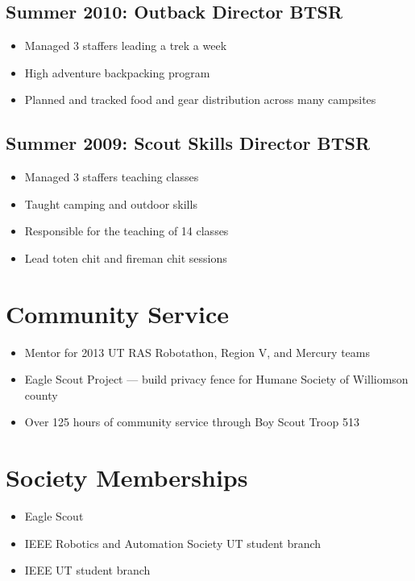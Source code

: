 \documentclass[letterpaper,12pt]{resume}
\begin{document}
\subsection{Summer 2010: Outback Director BTSR}
\begin{itemize}
  \item
    Managed 3 staffers leading a trek a week
  \item
    High adventure backpacking program
  \item
    Planned and tracked food and gear distribution across many campsites
\end{itemize}

\subsection{Summer 2009: Scout Skills Director BTSR}
\begin{itemize}
  \item
    Managed 3 staffers teaching classes
  \item
    Taught camping and outdoor skills
  \item
    Responsible for the teaching of 14 classes
  \item
    Lead toten chit and fireman chit sessions
\end{itemize}

\section{Community Service}
\begin{itemize}
  \item
    Mentor for 2013 UT RAS Robotathon, Region V, and Mercury teams
  \item
    Eagle Scout Project --- build privacy fence for Humane Society of Williomson county
  \item
    Over 125 hours of community service through Boy Scout Troop 513
\end{itemize}

\section{Society Memberships}
\begin{itemize}
  \item
    Eagle Scout
  \item
    IEEE Robotics and Automation Society UT student branch
  \item
    IEEE UT student branch
\end{itemize}
\end{document}

